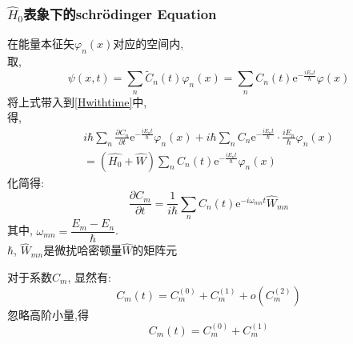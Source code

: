 \documentclass[a4paper, 11pt]{article}
\begin{document}
\begin{spacing}{1.2}
          \subsubsection{$\hat{H}_0$表象下的schr\"odinger Equation}
          在能量本征矢$\varphi_n(x)$对应的空间内,\\ 
          取,
          \begin{equation}
            \psi(x,t) = \sum_n \tilde{C}_n(t) \varphi_n(x)
                      = \sum_n C_n(t)\mathrm{e}^{-\frac{iE_nt}{\hbar}} \varphi(x)
          \end{equation}
          将上式带入到\eqref{Hwithtime}中,\\
          得,
          \begin{equation}
            \begin{aligned}
            i\hbar\sum_n\frac{\partial C_n}{\partial t}\mathrm{e}^{-\frac{iE_nt}{\hbar}}\varphi_n(x)
            + i\hbar\sum_nC_n\mathrm{e}^{-\frac{iE_nt}{\hbar}}\cdot\frac{iE_n}{\hbar}\varphi_n(x)\\
            = (\hat{H_0}+\hat{W})\sum_nC_n(t)\mathrm{e}^{-\frac{iE_nt}{\hbar}}\varphi_n(x)
            \end{aligned}
          \end{equation}
          化简得:
          \begin{equation}
            \label{cm}
            \frac{\partial C_m}{\partial t} = \frac{1}{i\hbar}\sum_n C_n(t)
            \mathrm{e}^{-{i\omega_{mn}t}} \hat{W}_{mn}
          \end{equation}
          其中, $\omega_{mn} = \dfrac{E_m-E_n}{\hbar}$. \\
          $\hbar$,  $\hat{W}_{mn}$是微扰哈密顿量$\hat{W}$的矩阵元

          对于系数$C_m$, 显然有:
          \begin{equation}
            C_m(t) = C_m^{(0)} +  C_m^{(1)} + o(C_m^{(2)})
          \end{equation}
          忽略高阶小量,得
          \begin{equation}
            C_m(t) = C_m^{(0)} +  C_m^{(1)}
          \end{equation}


\end{spacing}
\end{document}

